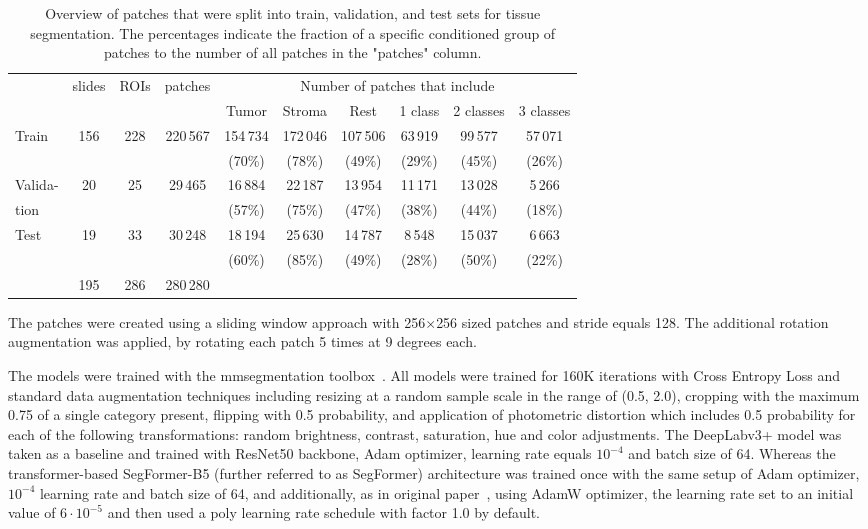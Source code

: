 \begin{table}[H]
    \centering
    \begin{tabular}{ l c c c c c c c c c}
        \hline
        & \multirow{2}{*}{slides} & \multirow{2}{*}{ROIs}& \multirow{2}{*}{patches}& \multicolumn{6}{c}{Number of patches that include}\\ 
        \cline{5-10}
        & & & & Tumor & Stroma & Rest & 1 class & 2 classes & 3 classes\\
        \hline
        Train & 156 & 228 & 220\,567 & 154\,734 & 172\,046 & 107\,506 & 63\,919 & 99\,577 & 57\,071 \\
         &  &  &  & (70\%) & (78\%) & (49\%) & (29\%) & (45\%) & (26\%) \\
        Valida- & 20 & 25 & 29\,465 & 16\,884 & 22\,187 & 13\,954 & 11\,171 & 13\,028 & 5\,266 \\
        tion &  &  &  & (57\%) & (75\%) & (47\%) & (38\%) & (44\%) & (18\%)\\
        Test & 19 & 33 & 30\,248 & 18\,194 & 25\,630 & 14\,787 & 8\,548 & 15\,037 & 6\,663\\
         &  &  &  & (60\%) & (85\%) & (49\%) & (28\%) & (50\%) & (22\%)\\
        \hline
        & 195 & 286 & 280\,280 &  &  &  & & & \\
    \end{tabular}
    \caption{\label{tab:patch_sep} Overview of patches that were split into train, validation,
    and test sets for tissue segmentation. The percentages indicate the fraction of a specific conditioned group of patches to the number of all patches in the "patches" column.}
\end{table}
The patches were created using a sliding window approach with 256$\times$256 sized patches
and stride equals 128. The additional rotation augmentation was applied, by rotating each patch
5 times at 9 degrees each.

The models were trained with the mmsegmentation toolbox~\cite{mmseg2020}. 
All models were trained for 160K iterations with Cross Entropy Loss and
standard data augmentation techniques including resizing at a random sample scale in the range
of (0.5, 2.0), cropping with the maximum 0.75 of a single category present, flipping with 0.5 probability,
and application of photometric distortion which includes 0.5 probability for each of the following transformations: random brightness, contrast, saturation, hue and color adjustments. 
The DeepLabv3+ model was taken as a baseline and trained with ResNet50 backbone,
Adam optimizer, learning rate equals $10^{-4}$ and batch size of 64. Whereas the
transformer-based SegFormer-B5 (further referred to as SegFormer) architecture was trained once with the same setup of
Adam optimizer, $10^{-4}$  learning rate and batch size of 64, and additionally, as 
in original paper~\cite*{xie2021segformer}, using AdamW optimizer, the learning rate
set to an initial value of $6 \cdot 10^{-5}$  and then used a poly learning rate schedule with
factor 1.0 by default.


